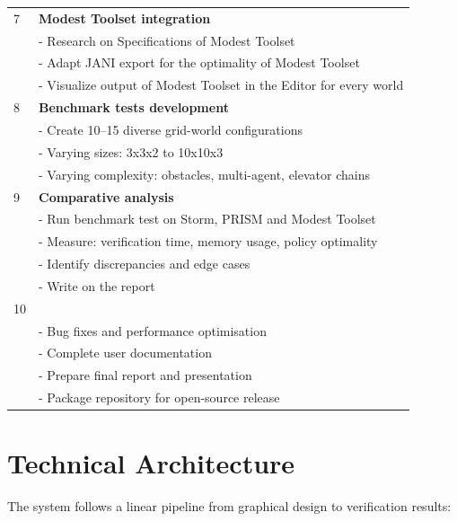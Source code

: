 \documentclass{report}
\begin{document}
\begin{table}[h]
\begin{tabular}{|p{1.5cm}|p{11cm}|}
7 & \textbf{Modest Toolset integration} \\
    & - Research on Specifications of Modest Toolset \\
    & - Adapt JANI export for the optimality of Modest Toolset \\
    & - Visualize output of Modest Toolset in the Editor for every world \\ \hline
8 & \textbf{Benchmark tests development} \\
    & - Create 10--15 diverse grid-world configurations \\
    & - Varying sizes: 3x3x2 to 10x10x3 \\
    & - Varying complexity: obstacles, multi-agent, elevator chains  \\ \hline
9 & \textbf{Comparative analysis} \\
    & - Run benchmark test on Storm, PRISM and Modest Toolset \\
    & - Measure: verification time, memory usage, policy optimality \\
    & - Identify discrepancies and edge cases \\
    & - Write on the report \\ \hline
10 & \textbf{Refinement \and final deliverables} \\
    & - Bug fixes and performance optimisation \\
    & - Complete user documentation \\
    & - Prepare final report and presentation \\
    & - Package repository for open-source release \\ \hline
\end{tabular}
\end{table}

\section*{Technical Architecture}

The system follows a linear pipeline from graphical design to verification results:
\end{document}
